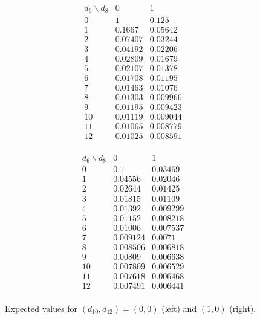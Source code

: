 \documentclass[11pt, oneside]{article} 	%
\begin{document}
\begin{figure}[ht]
    \centering
    \begin{minipage}{0.45\textwidth}
    \centering
    \[
    \begin{array}{c|cc}
    d_6 \backslash d_8 & 0 & 1\\\hline
    0&1&0.125\\
    1&0.1667&0.05642\\
    2&0.07407&0.03244\\
    3&0.04192&0.02206\\
    4&0.02809&0.01679\\
    5&0.02107&0.01378\\
    6&0.01708&0.01195\\
    7&0.01463&0.01076\\
    8&0.01303&0.009966\\
    9&0.01195&0.009423\\
    10&0.01119&0.009044\\
    11&0.01065&0.008779\\
    12&0.01025&0.008591\\
    \end{array}
    \]
    \end{minipage}
    \hfill
    \begin{minipage}{0.45\textwidth}
    \centering
    \[
    \begin{array}{c|cc}
    d_6 \backslash d_8 & 0 & 1\\\hline
    0&0.1&0.03469\\
    1&0.04556&0.02046\\
    2&0.02644&0.01425\\
    3&0.01815&0.01109\\
    4&0.01392&0.009299\\
    5&0.01152&0.008218\\
    6&0.01006&0.007537\\
    7&0.009124&0.0071\\
    8&0.008506&0.006818\\
    9&0.00809&0.006638\\
    10&0.007809&0.006529\\
    11&0.007618&0.006468\\
    12&0.007491&0.006441\\
    \end{array}
    \]
    \end{minipage}
    \caption{Expected values for $(d_{10},d_{12})=(0,0)$ (left) and $(1,0)$ (right).}
    \label{fig:ev-tables-1}
\end{figure}
\end{document}
